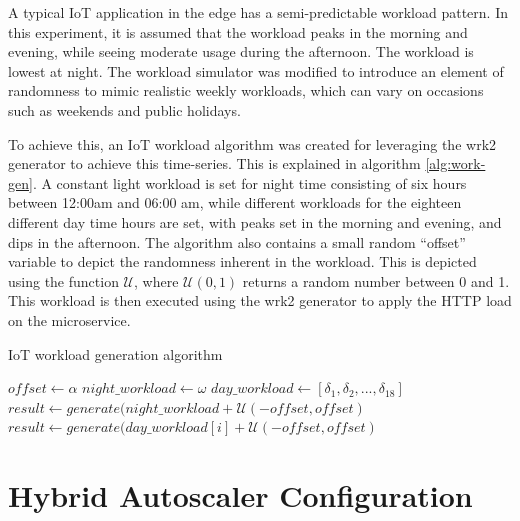 A typical IoT application in the edge has a semi-predictable workload pattern. In this experiment, it is assumed that the workload peaks in the morning and evening, while seeing moderate usage during the afternoon. The workload is lowest at night. The workload simulator was modified to introduce an element of randomness to mimic realistic weekly workloads, which can vary on occasions such as weekends and public holidays.\par

To achieve this, an IoT workload algorithm was created for leveraging the wrk2 generator to achieve this time-series. This is explained in algorithm \ref{alg:work-gen}. A constant light workload is set for night time consisting of six hours between 12:00am and 06:00 am, while different workloads for the eighteen different day time hours are set, with peaks set in the morning and evening, and dips in the afternoon. The algorithm also contains a small random ``offset'' variable to depict the randomness inherent in the workload. This is depicted using the function $\mathcal{U}$, where $\mathcal{U}(0,1)$ returns a random number between 0 and 1. This workload is then executed using the wrk2 generator to apply the HTTP load on the microservice.

\begin{algorithm}
    \caption{IoT workload generation algorithm}
    \label{alg:work-gen}
    \begin{algorithmic}
        \State $offset \gets \alpha$
        \State $night\_workload \gets \omega$
        \State $day\_workload \gets [ \delta_1, \delta_2, ... , \delta_{18}]$
                \State $result \gets generate(night\_workload + \mathcal{U}(-offset,offset)$
            \EndFor
                \State $result \gets generate(day\_workload[i] + \mathcal{U}(-offset,offset)$
            \EndFor
        \EndWhile
    \end{algorithmic}
\end{algorithm}

\section{Hybrid Autoscaler Configuration}
\label{ref:hybrid-auto-arch}


